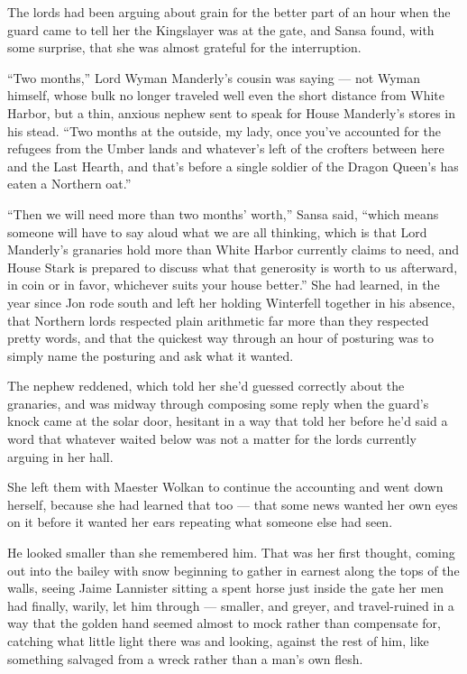 The lords had been arguing about grain for the better part of an hour when the guard came to tell her the Kingslayer was at the gate, and Sansa found, with some surprise, that she was almost grateful for the interruption.

“Two months,” Lord Wyman Manderly’s cousin was saying — not Wyman himself, whose bulk no longer traveled well even the short distance from White Harbor, but a thin, anxious nephew sent to speak for House Manderly’s stores in his stead. “Two months at the outside, my lady, once you’ve accounted for the refugees from the Umber lands and whatever’s left of the crofters between here and the Last Hearth, and that’s before a single soldier of the Dragon Queen’s has eaten a Northern oat.”

“Then we will need more than two months’ worth,” Sansa said, “which means someone will have to say aloud what we are all thinking, which is that Lord Manderly’s granaries hold more than White Harbor currently claims to need, and House Stark is prepared to discuss what that generosity is worth to us afterward, in coin or in favor, whichever suits your house better.” She had learned, in the year since Jon rode south and left her holding Winterfell together in his absence, that Northern lords respected plain arithmetic far more than they respected pretty words, and that the quickest way through an hour of posturing was to simply name the posturing and ask what it wanted.

The nephew reddened, which told her she’d guessed correctly about the granaries, and was midway through composing some reply when the guard’s knock came at the solar door, hesitant in a way that told her before he’d said a word that whatever waited below was not a matter for the lords currently arguing in her hall.

She left them with Maester Wolkan to continue the accounting and went down herself, because she had learned that too — that some news wanted her own eyes on it before it wanted her ears repeating what someone else had seen.

\sceneBreak

He looked smaller than she remembered him. That was her first thought, coming out into the bailey with snow beginning to gather in earnest along the tops of the walls, seeing Jaime Lannister sitting a spent horse just inside the gate her men had finally, warily, let him through — smaller, and greyer, and travel-ruined in a way that the golden hand seemed almost to mock rather than compensate for, catching what little light there was and looking, against the rest of him, like something salvaged from a wreck rather than a man’s own flesh.

